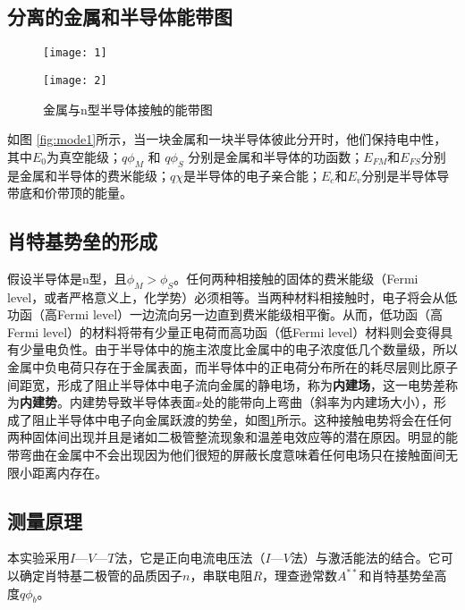 \documentclass[aps,pre,12pt,preprint,onecolumn,showpacs,showkeys]{revtex4-1}
\begin{document}
    \subsection{分离的金属和半导体能带图}
        \begin{figure}[h]
            \begin{minipage}[t]{0.45\textwidth}
                \centering
                \texttt{[image: 1]}
                \caption{\label{fig:mode1}%
                分离的金属和半导体能带图}
            \end{minipage}
            \begin{minipage}[t]{0.45\textwidth}
                \centering
                \texttt{[image: 2]}
                \caption{\label{fig:mode2}%
                金属与n型半导体接触的能带图}
            \end{minipage}
        \end{figure}
        如图 \ref{fig:mode1}所示，当一块金属和一块半导体彼此分开时，他们保持电中性，其中$E_0$为真空能级；$q \phi _M$ 和 $q\phi _S$ 分别是金属和半导体的功函数；$E_{FM}$和$E_{FS}$分别是金属和半导体的费米能级；$q\chi$是半导体的电子亲合能；$E_c$和$E_v$分别是半导体导带底和价带顶的能量。
    \subsection{肖特基势垒的形成}
        
        假设半导体是n型，且$\phi_M>\phi_S$。任何两种相接触的固体的费米能级（Fermi level，或者严格意义上，化学势）必须相等。当两种材料相接触时，电子将会从低功函（高Fermi level）一边流向另一边直到费米能级相平衡。从而，低功函（高Fermi level）的材料将带有少量正电荷而高功函（低Fermi level）材料则会变得具有少量电负性。由于半导体中的施主浓度比金属中的电子浓度低几个数量级，所以金属中负电荷只存在于金属表面，而半导体中的正电荷分布所在的耗尽层则比原子间距宽，形成了阻止半导体中电子流向金属的静电场，称为\textbf{内建场}，这一电势差称为\textbf{内建势}。内建势导致半导体表面$x$处的能带向上弯曲（斜率为内建场大小），形成了阻止半导体中电子向金属跃渡的势垒，如图\ref{fig:mode2}所示。这种接触电势将会在任何两种固体间出现并且是诸如二极管整流现象和温差电效应等的潜在原因。明显的能带弯曲在金属中不会出现因为他们很短的屏蔽长度意味着任何电场只在接触面间无限小距离内存在。

    \subsection{测量原理}
        本实验采用$I$—$V$—$T$法，它是正向电流电压法（$I$—$V$法）与激活能法的结合。它可以确定肖特基二极管的品质因子$n$，串联电阻$R$，理查逊常数$A^{**}$和肖特基势垒高度$q\phi_b$。
\end{document}
